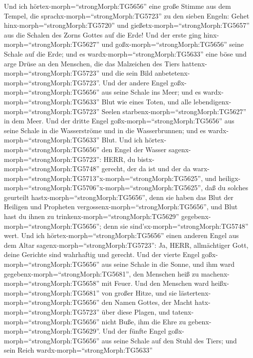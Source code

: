  Und ich hörtex-morph=``strongMorph:TG5656'' eine große
Stimme aus dem Tempel, die sprachx-morph=``strongMorph:TG5723'' zu den
sieben Engeln: Gehet hinx-morph=``strongMorph:TG5720'' und
gießetx-morph=``strongMorph:TG5657'' aus die Schalen des Zorns Gottes
auf die Erde!  Und der erste ging
hinx-morph=``strongMorph:TG5627'' und goßx-morph=``strongMorph:TG5656''
seine Schale auf die Erde; und es wardx-morph=``strongMorph:TG5633''
eine böse und arge Drüse an den Menschen, die das Malzeichen des Tiers
hattenx-morph=``strongMorph:TG5723'' und die sein Bild
anbetetenx-morph=``strongMorph:TG5723''.  Und der andere
Engel goßx-morph=``strongMorph:TG5656'' aus seine Schale ins Meer; und
es wardx-morph=``strongMorph:TG5633'' Blut wie eines Toten, und alle
lebendigenx-morph=``strongMorph:TG5723'' Seelen
starbenx-morph=``strongMorph:TG5627'' in dem Meer.  Und der
dritte Engel goßx-morph=``strongMorph:TG5656'' aus seine Schale in die
Wasserströme und in die Wasserbrunnen; und es
wardx-morph=``strongMorph:TG5633'' Blut.  Und ich
hörtex-morph=``strongMorph:TG5656'' den Engel der Wasser
sagenx-morph=``strongMorph:TG5723'': HERR, du
bistx-morph=``strongMorph:TG5748'' gerecht, der da ist und der da
warx-morph=``strongMorph:TG5713''\textbar x-morph=``strongMorph:TG5625'',
und
heiligx-morph=``strongMorph:TG5706''\textbar x-morph=``strongMorph:TG5625'',
daß du solches geurteilt hastx-morph=``strongMorph:TG5656'',
 denn sie haben das Blut der Heiligen und Propheten
vergossenx-morph=``strongMorph:TG5656'', und Blut hast du ihnen zu
trinkenx-morph=``strongMorph:TG5629''
gegebenx-morph=``strongMorph:TG5656''; denn sie
sind'sx-morph=``strongMorph:TG5748'' wert.  Und ich
hörtex-morph=``strongMorph:TG5656'' einen anderen Engel aus dem Altar
sagenx-morph=``strongMorph:TG5723'': Ja, HERR, allmächtiger Gott, deine
Gerichte sind wahrhaftig und gerecht.  Und der vierte Engel
goßx-morph=``strongMorph:TG5656'' aus seine Schale in die Sonne, und ihm
ward gegebenx-morph=``strongMorph:TG5681'', den Menschen heiß zu
machenx-morph=``strongMorph:TG5658'' mit Feuer.  Und den
Menschen ward heißx-morph=``strongMorph:TG5681'' von großer Hitze, und
sie lästertenx-morph=``strongMorph:TG5656'' den Namen Gottes, der Macht
hatx-morph=``strongMorph:TG5723'' über diese Plagen, und
tatenx-morph=``strongMorph:TG5656'' nicht Buße, ihm die Ehre zu
gebenx-morph=``strongMorph:TG5629''.  Und der fünfte Engel
goßx-morph=``strongMorph:TG5656'' aus seine Schale auf den Stuhl des
Tiers; und sein Reich wardx-morph=``strongMorph:TG5633''
